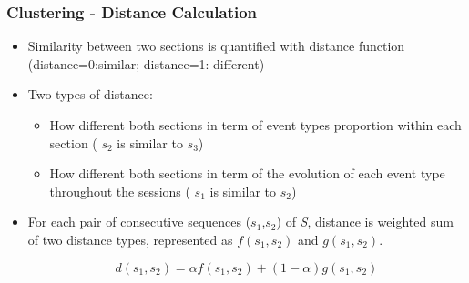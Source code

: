 \documentclass[xcolor=table]{beamer}
\begin{document}
\begin{frame}
\frametitle{Clustering - Distance Calculation}
\begin{itemize}
\item Similarity between two sections is quantified with distance function (distance=0:similar; distance=1: different)
\item Two types of distance: 
\begin{itemize}
\item How different both sections in term of event types proportion within each section ( $s_2$ is similar to $s_3$)
\item How different both sections in term of the evolution of each event type throughout the sessions ( $s_1$ is similar to $s_2$)
\end{itemize}


\item For each pair of consecutive sequences ($\textit{s}_1$,$\textit{s}_2$) of \textit{S}, distance is weighted sum of two distance types, represented as $\textit{f}(\textit{s}_1,\textit{s}_2)$ and $\textit{g}(\textit{s}_1,\textit{s}_2)$.

$$d(\textit{s}_1,\textit{s}_2) = \alpha\textit{f}(\textit{s}_1,\textit{s}_2) + (1 - \alpha)\textit{g}(\textit{s}_1,\textit{s}_2)$$
\end{itemize}


\end{frame}
\end{document}
